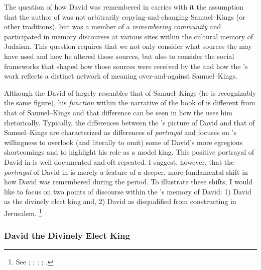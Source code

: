 The question of how David was remembered in \chronicles carries with it the assumption that the author of \chronicles was not arbitrarily copying-and-changing Samuel--Kings (or other traditions), but was a member of a \emph{remembering community} and participated in memory discourses at various sites within the cultural memory of \secondtemple Judaism. This question requires that we not only consider what sources the \chronicler may have used and how he altered those sources, but also to consider the social frameworks that shaped how those sources were received by the \chronicler and how the \chronicler's work reflects a distinct network of meaning over-and-against Samuel--Kings.

Although the David of \chronicles largely resembles that of Samuel--Kings (he is recognizably the same figure), his \emph{function} within the narrative of the book of \chronicles is different from that of Samuel--Kings and that difference can be seen in how the \chronicler uses him rhetorically. Typically, the differences between the \chronicler's picture of David and that of Samuel--Kings are characterized as differences of \emph{portrayal} and focuses on \chronicler's willingness to overlook (and literally to omit) some of David's more egregious shortcomings and to highlight his role as a model king. This positive portrayal of David in \chronicles is well documented and oft repeated. I suggest, however, that the \emph{portrayal} of David in \chronicles is merely a feature of a deeper, more fundamental shift in how David was remembered during the \secondtemple period. To illustrate these shifts, I would like to focus on two points of discourse within the \chronicler's memory of David: 1) David as the divinely elect king and, 2) David as disqualified from constructing \thetemple in Jerusalem.%
    \footnote{See \cite{jarick_frohlich2019}; \cite[347--383]{japhet2009} \cite{knoppers_biblica1995}; \cite[47--48]{japhet1993}; \cite[44--48]{klein2006}; \cite[80--85]{knoppers2003}.}

\subsubsection{David the Divinely Elect King}

